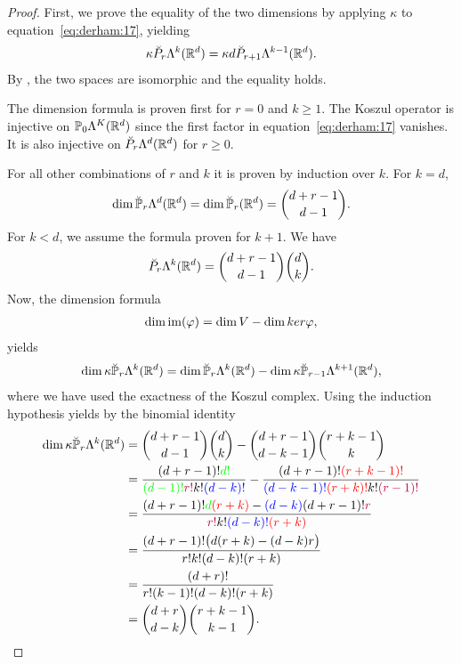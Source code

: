\begin{proof}
  First, we prove the equality of the two dimensions by applying $\kappa$
  to equation~\eqref{eq:derham:17}, yielding
  \begin{gather*}
    \kappa \breve P_r\Lambda^k(\mathbb R^d)
    = \kappa d \breve P_{r+1}\Lambda^{k-1}(\mathbb R^d).
  \end{gather*}
  By , the two spaces are
  isomorphic and the equality holds.

  The dimension formula is proven first for $r=0$ and $k\ge 1$. The
  Koszul operator is injective on $\mathbb P_0\Lambda^K(\mathbb R^d)$ since the
  first factor in equation~\eqref{eq:derham:17} vanishes. It is
  also injective on $\breve P_r\Lambda^d(\mathbb R^d)$ for $r\ge 0$.

  For all other combinations of $r$ and $k$ it is proven by induction
  over $k$. For $k=d$,
  \begin{gather*}
    \dim \breve{\mathbb P}_r\Lambda^d(\mathbb R^d) = \dim\breve{\mathbb P}_r(\mathbb R^d)
    = \binom{d+r-1}{d-1}.
  \end{gather*}
  For $k<d$, we assume the formula proven for $k+1$. We have
  \begin{gather*}
    \breve P_r\Lambda^k(\mathbb R^d) = \binom{d+r-1}{d-1}\binom{d}{k}.
  \end{gather*}
  Now, the dimension formula
  \begin{gather*}
    \dim \operatorname{im}(\varphi) = \dim V - \dim ker \varphi,
  \end{gather*}
  yields
  \begin{gather*}
    \dim\kappa\breve {\mathbb P}_r\Lambda^k(\mathbb R^d) =
    \dim\breve {\mathbb P}_r\Lambda^k(\mathbb R^d)
    - \dim\kappa\breve {\mathbb P}_{r-1}\Lambda^{k+1}(\mathbb R^d),
  \end{gather*}
  where we have used the exactness of the Koszul complex.
  Using the induction hypothesis yields by the binomial identity
  \begin{align*}
    \dim\kappa\breve {\mathbb P}_r\Lambda^k(\mathbb R^d) 
    &= \binom{d+r-1}{d-1}\binom{d}{k} - \binom{d+r-1}{d-k-1}\binom{r+k-1}{k}
    \\
    &= \frac{(d+r-1)!{\color{green}d!}}{{\color{green}(d-1)!}{\color{purple}r!}k!{\color{blue}(d-k)!}}
      - \frac{(d+r-1)!{\color{red}(r+k-1)!}}{{\color{blue}(d-k-1)!}
      {\color{red}(r+k)!}k!{\color{purple}(r-1)!}}
    \\
    &=
      \frac{(d+r-1)!{\color{green}d}{\color{red}(r+k)}-{\color{blue}(d-k)}(d+r-1)!{\color{purple}r}}
      {{\color{purple}r!}k!{\color{blue}(d-k)!}{\color{red}(r+k)}}
    \\
    &= \frac{(d+r-1)!\bigl(d(r+k)-(d-k)r\bigr)}{r!k!(d-k)!(r+k)}
    \\
    &= \frac{(d+r)!}{r!(k-1)!(d-k)!(r+k)}
    \\
    &= \binom{d+r}{d-k}\binom{r+k-1}{k-1}.
  \end{align*}
\end{proof}

